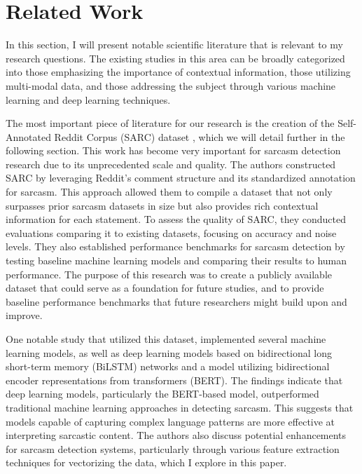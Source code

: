 \section{Related Work}

In this section, I will present notable scientific literature that is relevant to my research questions. 
The existing studies in this area can be broadly categorized into those emphasizing the importance of contextual information, 
those utilizing multi-modal data, and those addressing the subject through various machine learning and deep learning techniques.

The most important piece of literature for our research is the creation of the Self-Annotated Reddit Corpus (SARC) dataset \cite{SARC}, which we will detail further in the following section. 
This work has become very important for sarcasm detection research due to its unprecedented scale and quality. The authors constructed SARC by leveraging Reddit's comment structure and its 
standardized annotation for sarcasm. This approach allowed them to compile a dataset that not only surpasses prior sarcasm datasets in size but also provides rich contextual information for 
each statement. To assess the quality of SARC, they conducted evaluations comparing it to existing datasets, focusing on accuracy and noise levels. They also established performance benchmarks 
for sarcasm detection by testing baseline machine learning models and comparing their results to human performance. The purpose of this research was to create a publicly available dataset that 
could serve as a foundation for future studies, and to provide baseline performance benchmarks that future researchers might build upon and improve.

One notable study \cite{Sandor_2024} that utilized this dataset, implemented several machine learning models, as well as deep learning models based on bidirectional long short-term memory (BiLSTM) 
networks and a model utilizing bidirectional encoder representations from transformers (BERT). The findings indicate that deep learning models, particularly the BERT-based model, outperformed 
traditional machine learning approaches in detecting sarcasm. This suggests that models capable of capturing complex language patterns are more effective at interpreting sarcastic content. 
The authors also discuss potential enhancements for sarcasm detection systems, particularly through various feature extraction techniques for vectorizing the data, which I explore in this paper.

